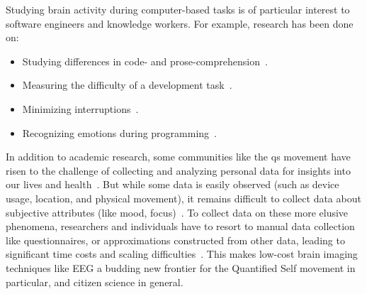 \begin{minipage}{\textwidth}
Studying brain activity during computer-based tasks is of particular interest to software engineers and knowledge workers. For example, research has been done on:

\begin{itemize}
    \item Studying differences in code- and prose-comprehension~\cite{floyd_decoding_2017,fucci_replication_2019}.
    \item Measuring the difficulty of a development task~\cite{fritz_using_2014}.
    \item Minimizing interruptions~\cite{zuger_reducing_2017}.
    \item Recognizing emotions during programming~\cite{girardi_recognizing_2020}.
\end{itemize}
\end{minipage}





In addition to academic research, some communities like the \gls{qs} movement have risen to the challenge of collecting and analyzing personal data for insights into our lives and health~\cite{swan_quantified_2013}. But while some data is easily observed (such as device usage, location, and physical movement), it remains difficult to collect data about subjective attributes (like mood, focus)~\cite{malhi_promise_2017}. To collect data on these more elusive phenomena, researchers and individuals have to resort to manual data collection like questionnaires, or approximations constructed from other data, leading to significant time costs and scaling difficulties~\cite{malhi_promise_2017}. This makes low-cost brain imaging techniques like EEG a budding new frontier for the Quantified Self movement in particular, and citizen science in general.


